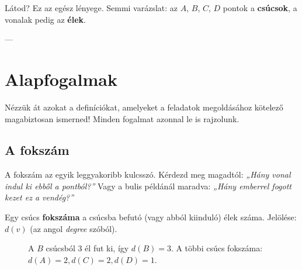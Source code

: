 \documentclass[a4paper,12pt]{article}
\theoremstyle{definition} %
\begin{document}
Látod? Ez az egész lényege. Semmi varázslat: az $A$, $B$, $C$, $D$ pontok a \textbf{csúcsok}, a vonalak pedig az \textbf{élek}.

---

\section{Alapfogalmak}

Nézzük át azokat a definíciókat, amelyeket a feladatok megoldásához kötelező magabiztosan ismerned! Minden fogalmat azonnal le is rajzolunk.

\subsection{A fokszám}

A fokszám az egyik leggyakoribb kulcsszó. Kérdezd meg magadtól: \textit{„Hány vonal indul ki ebből a pontból?”} Vagy a bulis példánál maradva: \textit{„Hány emberrel fogott kezet ez a vendég?”}

\begin{definiciodoboz}[Fokszám]
Egy csúcs \textbf{fokszáma} a csúcsba befutó (vagy abból kiinduló) élek száma. Jelölése: $d(v)$ (az angol \textit{degree} szóból).
\end{definiciodoboz}

\begin{figure}[H]
    \centering
    \caption{A $B$ csúcsból 3 él fut ki, így $d(B) = 3$. A többi csúcs fokszáma: $d(A)=2, d(C)=2, d(D)=1$.}
    \label{fig:degree}
\end{figure}
\end{document}
